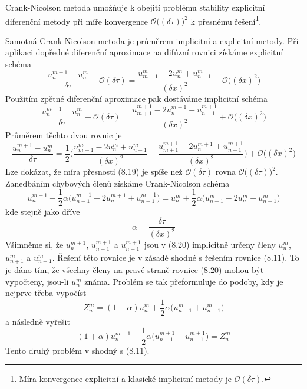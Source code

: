 \documentclass[a4paper]{book}
\begin{document}
Crank-Nicolson metoda umožňuje k obejití problému stability explicitní diferenční metody při míře konvergence $\mathcal{O}\Big( (\delta \tau) \Big)^2$ k přesnému řešení\footnote{Míra konvergence explicitní a klasické implicitní metody je $\mathcal{O}(\delta \tau)$.}.

Samotná Crank-Nicolson metoda je průměrem implicitní a explicitní metody. Při aplikaci dopředné diferenční aproximace na difúzní rovnici získáme explicitní schéma
\begin{equation*}
\frac{u_n^{m + 1} - u_n^m}{\delta \tau} + \mathcal{O}(\delta \tau) = \frac{u_{m+1}^m - 2u_n^m + u_{n-1}^m}{(\delta x)^2} + \mathcal{O}\Big( (\delta x)^2\Big)
\end{equation*} 
Použitím zpětné diferenční aproximace pak dostáváme implicitní schéma
 \begin{equation*}
\frac{u_n^{m + 1} - u_n^m}{\delta \tau} + \mathcal{O}(\delta \tau) = \frac{u_{m+1}^{m+1} - 2u_n^{m+1} + u_{n-1}^{m+1}}{(\delta x)^2} + \mathcal{O}\Big( (\delta x)^2 \Big)
\end{equation*}
Průměrem těchto dvou rovnic je
\begin{equation}
\frac{u_n^{m+1} - u_n^m}{\delta \tau} = \frac{1}{2}\Bigg( \frac{u_{m+1}^m - 2u_n^m + u_{n-1}^m}{(\delta x)^2} + \frac{u_{m+1}^{m+1} - 2u_n^{m+1} + u_{n-1}^{m+1}}{(\delta x)^2} \Bigg) + \mathcal{O}\Big( (\delta x)^2 \Big)
\end{equation}
Lze dokázat, že míra přesnosti (8.19) je spíše než $\mathcal{O}(\delta \tau)$ rovna $\mathcal{O}\Big( (\delta \tau) \Big)^2$. Zanedbáním chybových členů získáme Crank-Nicolson schéma
\begin{equation*}
u_n^{m+1} - \frac{1}{2}\alpha \Big( u_{n-1}^{m+1} - 2u_n^{m+1} + u_{n+1}^{m+1} \Big) = u_n^m + \frac{1}{2}\alpha \Big( u_{n-1}^m - 2u_n^m + u_{n+1}^m \Big)
\end{equation*}
kde stejně jako dříve
\begin{equation}
\alpha = \frac{\delta \tau}{(\delta x)^2}
\end{equation}
Všimněme si, že $u_n^{m+1}$, $u_{n-1}^{m+1}$ a $u_{n+1}^{m+1}$ jsou v (8.20) implicitně určeny členy $u_n^m$, $u_{n+1}^m$ a $u_{n-1}^m$. Řešení této rovnice je v zásadě shodné s řešením rovnice (8.11). To je dáno tím, že všechny členy na pravé straně rovnice (8.20) mohou být vypočteny, jsou-li $u_n^m$ známa. Problém se tak přeformuluje do podoby, kdy je nejprve třeba vypočíst
\begin{equation*}
Z_n^m = (1 - \alpha)u_n^m + \frac{1}{2}\alpha \Big( u_{n-1}^m + u_{n+1}^m \Big)
\end{equation*}
a následně vyřešit
\begin{equation}
(1 + \alpha)u_n^{m+1} - \frac{1}{2}\alpha \Big( u_{n-1}^{m+1} + u_{n+1}^{m+1} \Big) = Z_n^m
\end{equation}
Tento druhý problém v shodný s (8.11).
\end{document}
